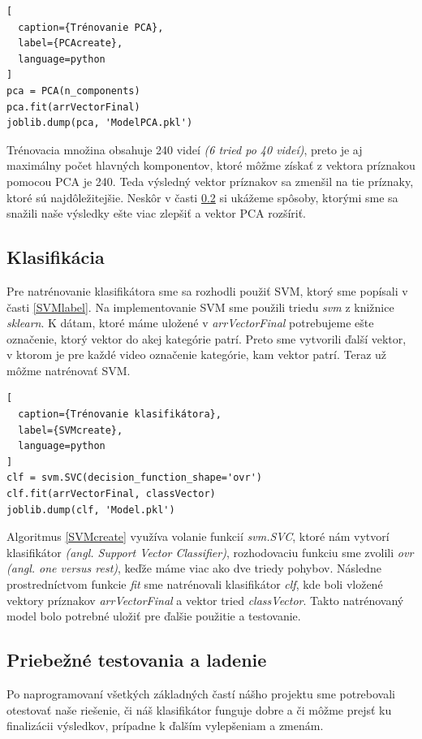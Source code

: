 \begin{lstlisting}[
  caption={Trénovanie PCA},
  label={PCAcreate},
  language=python
]
pca = PCA(n_components)
pca.fit(arrVectorFinal)
joblib.dump(pca, 'ModelPCA.pkl')   
\end{lstlisting}

Trénovacia množina obsahuje 240 videí \textit{(6 tried po 40 videí)}, preto je aj maximálny počet hlavných komponentov, ktoré môžme získať z vektora príznakou pomocou PCA je 240. Teda výsledný vektor príznakov sa zmenšil na tie príznaky, ktoré sú najdôležitejšie. Neskôr v časti \ref{testalad} si ukážeme spôsoby, ktorými sme sa snažili naše výsledky ešte viac zlepšiť a vektor PCA rozšíriť.  


\subsection{Klasifikácia}
Pre natrénovanie klasifikátora sme sa rozhodli použiť SVM, ktorý sme popísali v časti \ref{SVMlabel}. Na implementovanie SVM sme použili triedu \textit{svm} z knižnice \textit{sklearn}. K dátam, ktoré máme uložené v \textit{arrVectorFinal} potrebujeme ešte označenie, ktorý vektor do akej kategórie patrí. Preto sme vytvorili ďalší vektor, v ktorom je pre každé video označenie kategórie, kam vektor patrí. Teraz už môžme natrénovať SVM. 
\hfill \break
\begin{lstlisting}[
  caption={Trénovanie klasifikátora},
  label={SVMcreate},
  language=python
]
clf = svm.SVC(decision_function_shape='ovr')
clf.fit(arrVectorFinal, classVector)
joblib.dump(clf, 'Model.pkl') 
\end{lstlisting}
Algoritmus \ref{SVMcreate} využíva volanie funkcií \textit{svm.SVC}, ktoré nám vytvorí klasifikátor \textit{(angl. Support Vector Classifier)}, rozhodovaciu funkciu sme zvolili \textit{ovr} \textit{(angl. one versus rest)}, keďže máme viac ako dve triedy pohybov. Následne prostredníctvom funkcie \textit{fit} sme natrénovali klasifikátor \textit{clf}, kde boli vložené vektory príznakov \textit{arrVectorFinal} a vektor tried \textit{classVector}. Takto natrénovaný model bolo potrebné uložiť pre ďalšie použitie a testovanie. 

\subsection{Priebežné testovania a ladenie} \label{testalad}
Po naprogramovaní všetkých základných častí nášho projektu sme potrebovali otestovať naše riešenie, či náš klasifikátor funguje dobre a či môžme prejsť ku finalizácii výsledkov, prípadne k ďalším vylepšeniam a zmenám.


